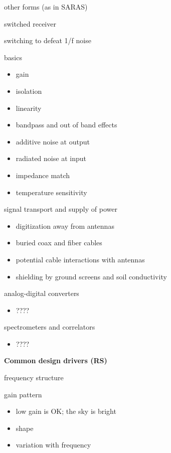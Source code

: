other forms (as in SARAS)

switched receiver

switching to defeat 1/f noise

basics

\begin{itemize}
\item
  gain
\item
  isolation
\item
  linearity
\item
  bandpass and out of band effects
\item
  additive noise at output
\item
  radiated noise at input
\item
  impedance match
\item
  temperature sensitivity
\end{itemize}

signal transport and supply of power

\begin{itemize}
\item
  digitization away from antennas
\item
  buried coax and fiber cables
\item
  potential cable interactions with antennas
\item
  shielding by ground screens and soil conductivity
\end{itemize}

analog-digital converters

\begin{itemize}
\item
  ????
\end{itemize}

spectrometers and correlators

\begin{itemize}
\item
  ????
\end{itemize}

\textbf{Common design drivers (RS)}

frequency structure

gain pattern{~}

\begin{itemize}
\item
  low gain is OK; the sky is bright
\item
  shape
\item
  variation with frequency
\end{itemize}

